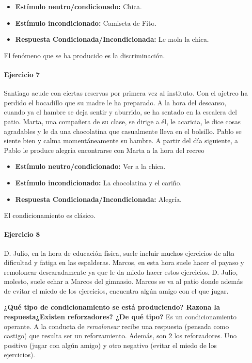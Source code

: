 \documentclass[palatino,nochap]{apuntesURJC}
\begin{document}
\begin{example}
\begin{itemize}
\item \textbf{Estímulo neutro/condicionado:} Chica.
\item \textbf{Estímulo incondicionado:} Camiseta de Fito.
\item \textbf{Respuesta Condicionada/Incondicionada:} Le mola la chica.
\end{itemize}

El fenómeno que se ha producido es la discriminación.

\paragraph{Ejercicio 7}


Santiago acude con ciertas reservas por primera vez al instituto. Con el ajetreo ha perdido el bocadillo que su madre le ha preparado. A la hora del descanso, cuando ya el hambre se deja sentir y aburrido, se ha sentado en la escalera del patio. Marta, una compañera de su clase, se dirige a él, le acaricia, le dice cosas agradables y le da una chocolatina que casualmente lleva en el bolsillo. Pablo se siente bien y calma momentáneamente su hambre. A partir del día siguiente, a Pablo le produce alegría encontrarse con Marta a la hora del recreo


\begin{itemize}
\item \textbf{Estímulo neutro/condicionado:} Ver a la chica.
\item \textbf{Estímulo incondicionado:} La chocolatina y el cariño.
\item \textbf{Respuesta Condicionada/Incondicionada:} Alegría.
\end{itemize}

El condicionamiento es clásico.

\paragraph{Ejercicio 8}
D. Julio, en la hora de educación física, suele incluir muchos ejercicios de alta dificultad y fatiga en las espalderas. Marcos, en esta hora suele hacer el payaso y remolonear descaradamente ya que le da miedo hacer estos ejercicios. D. Julio, molesto, suele echar a Marcos del gimnasio. Marcos se va al patio donde además de evitar el miedo de los ejercicios, encuentra algún amigo con el que jugar.

\textbf{¿Qué tipo de condicionamiento se está produciendo? Razona la respuesta}\textbf{¿Existen reforzadores? ¿De qué tipo?}
Es un condicionamiento operante. 
%
A la conducta de \textit{remolonear} recibe una respuesta (pensada como castigo) que resulta ser un reforzamiento. 
%
Además, son 2 los reforzadores. Uno positivo (jugar con algún amigo) y otro negativo (evitar el miedo de los ejercicios).




\end{example}
\end{document}
